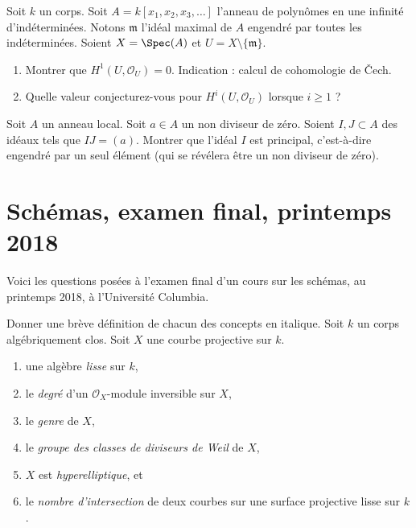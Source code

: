 \begin{exercise}
\label{exercise-cohomology-infinite-punctured}
Soit $k$ un corps. Soit $A = k[x_1, x_2, x_3, \ldots]$ l'anneau de polynômes
en une infinité d'indéterminées.
Notons $\mathfrak m$ l'idéal maximal de $A$ engendré par
toutes les indéterminées. Soient $X = \Spec(A)$ et $U = X \setminus \{\mathfrak m\}$.
\begin{enumerate}
\item Montrer que $H^1(U, \mathcal{O}_U) = 0$. Indication : calcul de
cohomologie de {\v C}ech.
\item Quelle valeur conjecturez-vous pour $H^i(U, \mathcal{O}_U)$ lorsque $i \geq 1$ ?
\end{enumerate}
\end{exercise}

\begin{exercise}
\label{exercise-principal}
Soit $A$ un anneau local. Soit $a \in A$ un non diviseur de zéro.
Soient $I, J \subset A$ des idéaux tels que $IJ = (a)$. Montrer que
l'idéal $I$ est principal, c'est-à-dire engendré par un seul élément
(qui se révélera être un non diviseur de zéro).
\end{exercise}



\section{Schémas, examen final, printemps 2018}
\label{section-final-exam-spring-2018}

\noindent
Voici les questions posées à l'examen final d'un cours sur les schémas,
au printemps 2018, à l'Université Columbia.

\begin{exercise}[Définitions]
\label{exercise-definitions-spring-2018}
Donner une brève définition de chacun des concepts en italique.
Soit $k$ un corps algébriquement clos.
Soit $X$ une courbe projective sur $k$.
\begin{enumerate}
\item une algèbre {\it lisse} sur $k$,
\item le {\it degré} d'un $\mathcal{O}_X$-module inversible sur $X$,
\item le {\it genre} de $X$,
\item le {\it groupe des classes de diviseurs de Weil} de $X$,
\item $X$ est {\it hyperelliptique}, et
\item le {\it nombre d'intersection}
de deux courbes sur une surface projective lisse sur $k$.
\end{enumerate}
\end{exercise}

